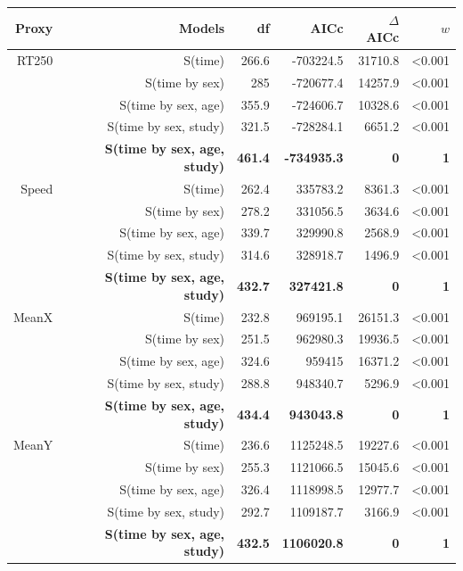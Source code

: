 \documentclass[a4paper,11pt]{article}
\begin{document}
\begin{table}[htbp]
    \begin{tabular}{rrrrrr}
      \\
      \hline  
      Proxy & Models & df    & AICc  & $\Delta$AICc & $w$ \\
      \hline
      RT250 & S(time) & 266.6 & -703224.5 & 31710.8 & <0.001 \\
            & S(time by sex) & 285   & -720677.4 & 14257.9 & <0.001 \\
            & S(time by sex, age) & 355.9 & -724606.7 & 10328.6 & <0.001 \\
            & S(time by sex, study) & 321.5 & -728284.1 & 6651.2 & <0.001 \\
            & \textbf{S(time by sex, age, study)} & \textbf{461.4} & \textbf{-734935.3} & \textbf{0} & \textbf{1} \\        
      \hline
      Speed & S(time) & 262.4 & 335783.2 & 8361.3 & <0.001 \\
            & S(time by sex) & 278.2 & 331056.5 & 3634.6 & <0.001 \\
            & S(time by sex, age) & 339.7 & 329990.8 & 2568.9 & <0.001 \\
            & S(time by sex, study) & 314.6 & 328918.7 & 1496.9 & <0.001 \\
            & \textbf{S(time by sex, age, study)} & \textbf{432.7} & \textbf{327421.8} & \textbf{0} & \textbf{1} \\
      \hline
     MeanX & S(time) & 232.8 & 969195.1 & 26151.3 & <0.001 \\
          & S(time by sex) & 251.5 & 962980.3 & 19936.5 & <0.001 \\
          & S(time by sex, age) & 324.6 & 959415 & 16371.2 & <0.001 \\
          & S(time by sex, study) & 288.8 & 948340.7 & 5296.9 & <0.001 \\
          & \textbf{S(time by sex, age, study)} & \textbf{434.4} & \textbf{943043.8} & \textbf{0}     & \textbf{1} \\ 
      \hline
      MeanY & S(time) & 236.6 & 1125248.5 & 19227.6 & <0.001 \\
          & S(time by sex) & 255.3 & 1121066.5 & 15045.6 & <0.001 \\
          & S(time by sex, age) & 326.4 & 1118998.5 & 12977.7 & <0.001 \\
          & S(time by sex, study) & 292.7 & 1109187.7 & 3166.9 & <0.001 \\
          & \textbf{S(time by sex, age, study)} & \textbf{432.5} & \textbf{1106020.8} & \textbf{0}     & \textbf{1} \\
      \hline 
    \end{tabular}
  \end{table}
  
\end{document}
